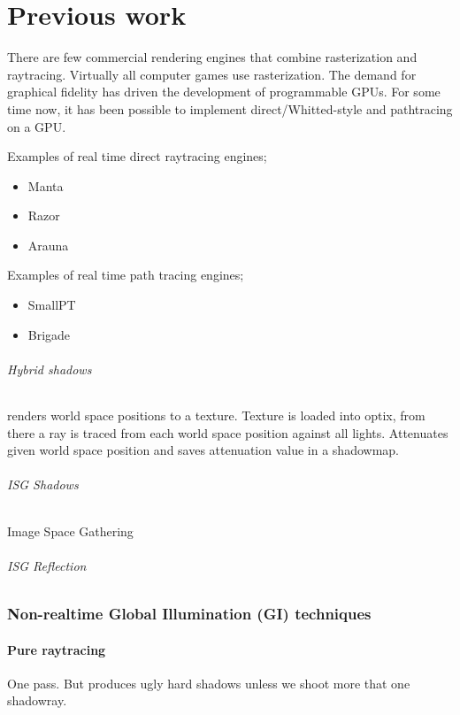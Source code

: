 \part{Previous work}

There are few commercial rendering engines that combine rasterization and raytracing. Virtually all computer games use rasterization. The demand for graphical fidelity has driven the development of programmable GPUs. For some time now, it has been possible to implement direct/Whitted-style and pathtracing on a GPU.

Examples of real time direct raytracing engines; 
\begin{itemize}
	\item Manta
	\item Razor
	\item Arauna
\end{itemize}

Examples of real time path tracing engines; 
\begin{itemize}
	\item SmallPT
	\item Brigade
\end{itemize}

\paragraph{Hybrid shadows} renders world space positions to a texture. Texture is loaded into optix, from there a ray is traced from each world space position against all lights. Attenuates given world space position and saves attenuation value in a shadowmap.

\paragraph{ISG Shadows} Image Space Gathering \cite{nvidiarobison09}
\paragraph{ISG Reflection}


\section {Non-realtime Global Illumination (GI) techniques}
		\subsection{Pure raytracing} 
		One pass. But produces ugly hard shadows unless we shoot more that one shadowray.
